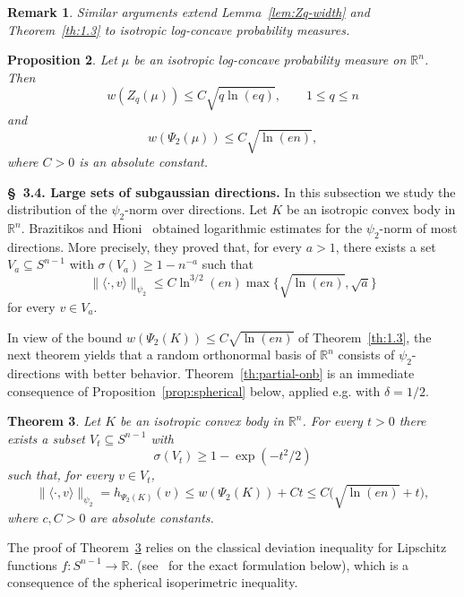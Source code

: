 \documentclass[11pt,leqno]{article}
\newtheorem{theorem}{Theorem}[section]
\newtheorem{proposition}[theorem]{Proposition}
\newtheorem{remark}[theorem]{Remark}
\theoremstyle{definition}
\numberwithin{equation}{section}
\newcommand{\ls}{\leqslant}
\newcommand{\gr}{\geqslant}
\begin{document}
\begin{remark}\rm Similar arguments extend Lemma~\ref{lem:Zq-width} and Theorem~\ref{th:1.3} to isotropic log-concave probability measures.
\end{remark}

\begin{proposition}\label{prop:width-measures}Let $\mu$ be an isotropic log-concave probability measure on $\mathbb{R}^n$. Then
\begin{equation}\label{eq:Zq-width-measure}w(Z_q(\mu))\ls C\sqrt{q\ln(eq)},\qquad 1\ls q\ls n\end{equation}
and 
\[w(\Psi_2(\mu))\ls C\sqrt{\ln(en)},\]
where $C>0$ is an absolute constant.
\end{proposition}



\medskip 

\noindent \textbf{\S~3.4. Large sets of subgaussian directions.}
In this subsection we study the distribution of the $\psi_2$-norm over directions. 
Let $K$ be an isotropic convex body in $\mathbb{R}^n$. Brazitikos and Hioni~\cite{Brazitikos-Hioni-2015} obtained
logarithmic estimates for the $\psi_2$-norm of most directions. More precisely, they proved that, for every $a>1$, there exists a set
$V_a\subseteq S^{n-1}$ with $\sigma(V_a)\gr 1-n^{-a}$ such that
\[\|\langle\cdot,v\rangle\|_{\psi_2}\ls C\ln^{3/2}(en)\max\{\sqrt{\ln(en)},\sqrt a\}\]
for every $v\in V_a$.

In view of the bound $w(\Psi_2(K))\ls C\sqrt{\ln(en)}$ of Theorem~\ref{th:1.3}, the next theorem yields that a random orthonormal basis of $\mathbb{R}^n$ consists of
$\psi_2$-directions with better behavior. Theorem~\ref{th:partial-onb} is an immediate consequence of Proposition~\ref{prop:spherical} below, applied e.g. with $\delta =1/2$.

\begin{theorem}\label{th:spherical}Let $K$ be an isotropic convex body in $\mathbb{R}^n$. For every $t>0$ there exists a
subset $V_t\subseteq S^{n-1}$ with
\[\sigma(V_t)\gr 1-\exp(-t^2/2)\]
such that, for every $v\in V_t$,
\begin{equation}\label{eq:onb-bound}
\|\langle\cdot,v\rangle\|_{\psi_2}=h_{\Psi_2(K)}(v)\ls w(\Psi_2(K))+Ct\ls C\big(\sqrt{\ln(en)}+t\big),
\end{equation}
where $c,C>0$ are absolute constants. 
\end{theorem}

The proof of Theorem~\ref{th:spherical} relies on the classical deviation inequality for Lipschitz functions $f:S^{n-1}\to {\mathbb R}$.
(see~\cite[Proposition~5.20]{Aubrun-Szarek-book} for the exact formulation below), which is a consequence of the spherical isoperimetric inequality.
\end{document}
